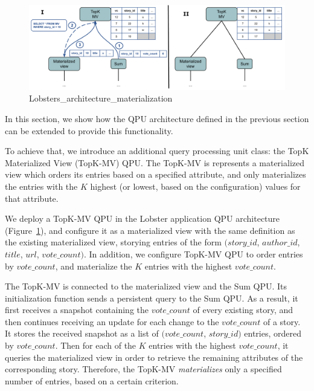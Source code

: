 \begin{figure}[t]
  \centering
    \includegraphics[scale=0.4]{./figures/case_studies/lobsters_architecture_materialization.pdf}
  \caption{Lobsters\_architecture\_materialization}
  \label{fig:lobsters_architecture_materialization}
\end{figure}

In this section, we show how the QPU architecture defined in the previous section can be extended to provide this
functionality.

To achieve that, we introduce an additional query processing unit class: the TopK Materialized View (TopK-MV) QPU.
The TopK-MV is represents a materialized view which orders its entries based on a specified attribute,
and only materializes the entries with the $K$ highest (or lowest, based on the configuration) values for that attribute.

We deploy a TopK-MV QPU in the Lobster application QPU architecture (Figure~\ref{fig:lobsters_architecture_materialization}),
and configure it as a materialized view with the same definition as the existing materialized view,
storying entries of the form $(story\_id$, $author\_id$, $title$, $url$, $vote\_count)$.
In addition, we configure TopK-MV QPU to order entries by $vote\_count$, and materialize the $K$ entries with the highest $vote\_count$.

The TopK-MV is connected to the materialized view and the Sum QPU.
Its initialization function sends a persistent query to the Sum QPU.
As a result, it first receives a snapshot containing the $vote\_count$ of every existing story,
and then continues receiving an update for each change to the $vote\_count$ of a story.
It stores the received snapshot as a list of $(vote\_count$, $story\_id)$ entries, ordered by $vote\_count$.
Then for each of the $K$ entries with the highest $vote\_count$,
it queries the materialized view in order to retrieve the remaining attributes of the corresponding story.
Therefore, the TopK-MV \textit{materializes} only a specified number of entries,
based on a certain criterion.

